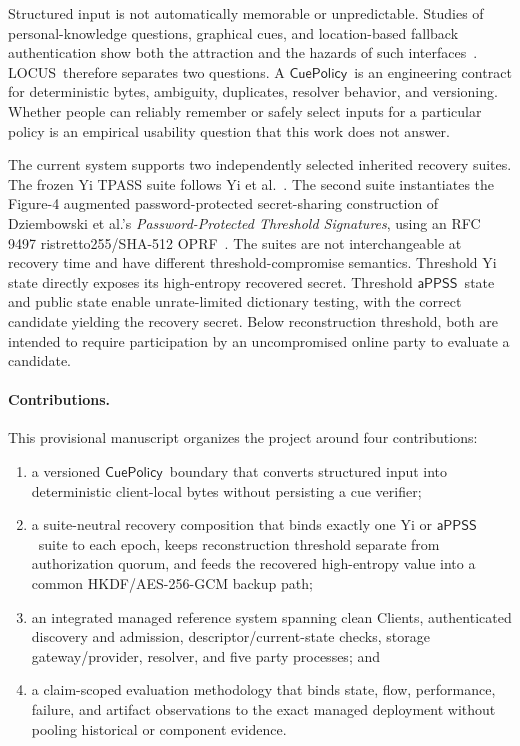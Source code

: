\documentclass[sigconf,anonymous]{acmart}
\newcommand{\LOCUS}{\textsf{LOCUS}}
\newcommand{\APPSS}{\ensuremath{\mathsf{aPPSS}}}
\newcommand{\CuePolicy}{\ensuremath{\mathsf{CuePolicy}}}
\begin{document}
Structured input is not automatically memorable or unpredictable. Studies of
personal-knowledge questions, graphical cues, and location-based fallback
authentication show both the attraction and the hazards of such
interfaces~\cite{Bonneau2015Secrets,Biddle2012Graphical,AlAmeen2017GeoPass,Hang2015LocationFallback}.
\LOCUS\ therefore separates two questions. A \CuePolicy\ is an engineering
contract for deterministic bytes, ambiguity, duplicates, resolver behavior,
and versioning. Whether people can reliably remember or safely select inputs
for a particular policy is an empirical usability question that this work does
not answer.

The current system supports two independently selected inherited recovery
suites. The frozen Yi TPASS suite follows Yi et
al.~\cite{Yi2015TPASS,Yi2019TPASS}. The second suite instantiates the
Figure-4 augmented password-protected secret-sharing construction of
Dziembowski et al.'s \emph{Password-Protected Threshold Signatures}, using an
RFC 9497 ristretto255/SHA-512 OPRF~\cite{RFC9497OPRF}. The suites are not
interchangeable at recovery time and have different threshold-compromise
semantics. Threshold Yi state directly exposes its high-entropy recovered
secret. Threshold \APPSS\ state and public state enable unrate-limited
dictionary testing, with the correct candidate yielding the recovery secret.
Below reconstruction threshold, both are intended to require participation by
an uncompromised online party to evaluate a candidate.

\paragraph{Contributions.}
This provisional manuscript organizes the project around four contributions:

\begin{enumerate}
  \item a versioned \CuePolicy\ boundary that converts structured input into
  deterministic client-local bytes without persisting a cue verifier;
  \item a suite-neutral recovery composition that binds exactly one Yi or
  \APPSS\ suite to each epoch, keeps reconstruction threshold separate from
  authorization quorum, and feeds the recovered high-entropy value into a
  common HKDF/AES-256-GCM backup path;
  \item an integrated managed reference system spanning clean Clients,
  authenticated discovery and admission, descriptor/current-state checks,
  storage gateway/provider, resolver, and five party processes; and
  \item a claim-scoped evaluation methodology that binds state, flow,
  performance, failure, and artifact observations to the exact managed
  deployment without pooling historical or component evidence.
\end{enumerate}
\end{document}
